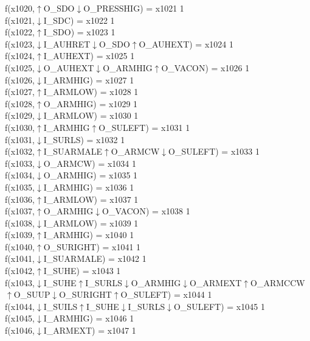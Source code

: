 f(x1020,$\uparrow$O\_SDO$\downarrow$O\_PRESSHIG) = x1021 {1} \\
f(x1021,$\downarrow$I\_SDC) = x1022 {1} \\
f(x1022,$\uparrow$I\_SDO) = x1023 {1} \\
f(x1023,$\downarrow$I\_AUHRET$\downarrow$O\_SDO$\uparrow$O\_AUHEXT) = x1024 {1} \\
f(x1024,$\uparrow$I\_AUHEXT) = x1025 {1} \\
f(x1025,$\downarrow$O\_AUHEXT$\downarrow$O\_ARMHIG$\uparrow$O\_VACON) = x1026 {1} \\
f(x1026,$\downarrow$I\_ARMHIG) = x1027 {1} \\
f(x1027,$\uparrow$I\_ARMLOW) = x1028 {1} \\
f(x1028,$\uparrow$O\_ARMHIG) = x1029 {1} \\
f(x1029,$\downarrow$I\_ARMLOW) = x1030 {1} \\
f(x1030,$\uparrow$I\_ARMHIG$\uparrow$O\_SULEFT) = x1031 {1} \\
f(x1031,$\downarrow$I\_SURLS) = x1032 {1} \\
f(x1032,$\uparrow$I\_SUARMALE$\uparrow$O\_ARMCW$\downarrow$O\_SULEFT) = x1033 {1} \\
f(x1033,$\downarrow$O\_ARMCW) = x1034 {1} \\
f(x1034,$\downarrow$O\_ARMHIG) = x1035 {1} \\
f(x1035,$\downarrow$I\_ARMHIG) = x1036 {1} \\
f(x1036,$\uparrow$I\_ARMLOW) = x1037 {1} \\
f(x1037,$\uparrow$O\_ARMHIG$\downarrow$O\_VACON) = x1038 {1} \\
f(x1038,$\downarrow$I\_ARMLOW) = x1039 {1} \\
f(x1039,$\uparrow$I\_ARMHIG) = x1040 {1} \\
f(x1040,$\uparrow$O\_SURIGHT) = x1041 {1} \\
f(x1041,$\downarrow$I\_SUARMALE) = x1042 {1} \\
f(x1042,$\uparrow$I\_SUHE) = x1043 {1} \\
f(x1043,$\downarrow$I\_SUHE$\uparrow$I\_SURLS$\downarrow$O\_ARMHIG$\downarrow$O\_ARMEXT$\uparrow$O\_ARMCCW$\uparrow$O\_SUUP$\downarrow$O\_SURIGHT$\uparrow$O\_SULEFT) = x1044 {1} \\
f(x1044,$\downarrow$I\_SUILS$\uparrow$I\_SUHE$\downarrow$I\_SURLS$\downarrow$O\_SULEFT) = x1045 {1} \\
f(x1045,$\downarrow$I\_ARMHIG) = x1046 {1} \\
f(x1046,$\downarrow$I\_ARMEXT) = x1047 {1} \\
